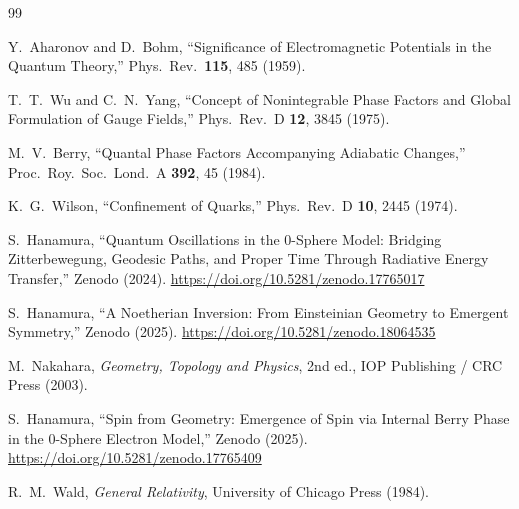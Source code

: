 \documentclass[%
 reprint,
 amsmath,amssymb,
 aps,
 prb,
]{revtex4-2}
\numberwithin{equation}{section}
\begin{document}
\begin{thebibliography}{99}

Y.~Aharonov and D.~Bohm,
``Significance of Electromagnetic Potentials in the Quantum Theory,''
Phys.\ Rev.\ \textbf{115}, 485 (1959).

T.~T.~Wu and C.~N.~Yang,
``Concept of Nonintegrable Phase Factors and Global Formulation of Gauge Fields,''
Phys.\ Rev.\ D \textbf{12}, 3845 (1975).

M.~V.~Berry,
``Quantal Phase Factors Accompanying Adiabatic Changes,''
Proc.\ Roy.\ Soc.\ Lond.\ A \textbf{392}, 45 (1984).

K.~G.~Wilson,
``Confinement of Quarks,''
Phys.\ Rev.\ D \textbf{10}, 2445 (1974).

S.~Hanamura,
``Quantum Oscillations in the 0-Sphere Model: Bridging Zitterbewegung, Geodesic Paths, and Proper Time Through Radiative Energy Transfer,''
Zenodo (2024).
\href{https://doi.org/10.5281/zenodo.17765017}{https://doi.org/10.5281/zenodo.17765017}

S.~Hanamura,
``A Noetherian Inversion: From Einsteinian Geometry to Emergent Symmetry,''
Zenodo (2025).
\href{https://doi.org/10.5281/zenodo.18064535}{https://doi.org/10.5281/zenodo.18064535}

M.~Nakahara,
\textit{Geometry, Topology and Physics},
2nd ed., IOP Publishing / CRC Press (2003).

S.~Hanamura,
``Spin from Geometry: Emergence of Spin via Internal Berry Phase in the 0-Sphere Electron Model,''
Zenodo (2025).
\href{https://doi.org/10.5281/zenodo.17765409}{https://doi.org/10.5281/zenodo.17765409}

R.~M.~Wald,
\textit{General Relativity},
University of Chicago Press (1984).


\end{thebibliography}
\end{document}
